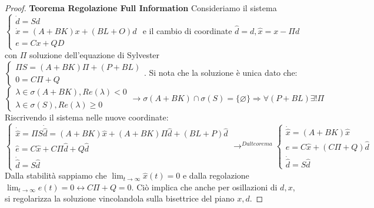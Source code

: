 \documentclass{article}
\theoremstyle{definition}
\begin{document}
\begin{proof}{\textbf{Teorema Regolazione Full Information}}
    Consideriamo il sistema \(\begin{cases}
        \dot{d}=Sd              \\
        \dot{x}=(A+BK)x+(BL+O)d \\
        e=Cx+QD
    \end{cases}\) e il cambio di coordinate \(\hat{d}=d,\hat{x}=x-\Pi d\) con \(\Pi \) soluzione dell'equazione di Sylvester \( \begin{cases}
        \Pi S=(A+BK)\Pi+(P+BL)\\
        0=C\Pi+Q
    \end{cases}\).\newline
    Si nota che la soluzione è unica dato che:\begin{equation*}
        \begin{cases}
            \lambda\in\sigma{(A+BK)},Re(\lambda )< 0 \\
            \lambda\in\sigma{(S)},Re(\lambda )\geq 0
        \end{cases}\rightarrow\sigma{(A+BK)}\cap\sigma{(S)}=\{\varnothing \}\Rightarrow \forall(P+BL)\exists!\Pi
    \end{equation*}
    Riscrivendo il sistema nelle nuove coordinate:
    \begin{equation*}
        \begin{cases}
            \dot{\hat{x}}=\Pi S\dot{\hat{d}}=(A+BK)\hat{x}+(A+BK)\Pi\hat{d}+(BL+P)\hat{d}\\
            \hat{e}=C\hat{x}+C\Pi\hat{d}+Q\hat{d}\\
            \dot{\hat{d}}=S\hat{d}
        \end{cases}
        \rightarrow^{Dal teorema}\begin{cases}
            \dot{\hat{x}}=(A+BK)\hat{x}\\
            e=C\hat{x}+(C\Pi+Q)\hat{d}\\
            \dot{\hat{d}}=S\hat{d}
        \end{cases}
    \end{equation*}
    Dalla stabilità sappiamo che \(\lim_{t\rightarrow\infty} \hat{x}(t)=0\) e dalla regolazione \(\lim_{t\rightarrow\infty}e(t)=0\leftrightarrow C\Pi+Q=0\). Ciò implica che anche per osillazioni di \(d,x\), si regolarizza la soluzione vincolandola sulla bisettrice del piano \(x,d\).
\end{proof}
\end{document}
